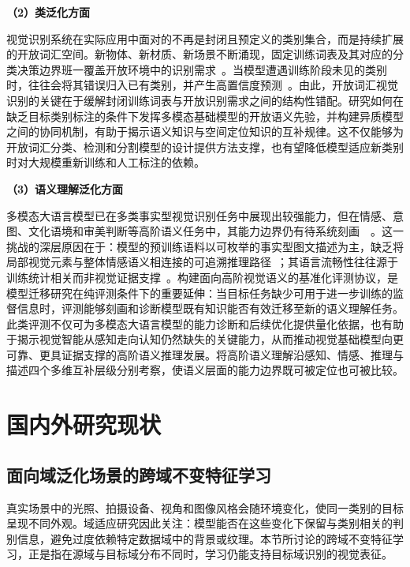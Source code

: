 \noindent\textbf{（2）类泛化方面} 

视觉识别系统在实际应用中面对的不再是封闭且预定义的类别集合，而是持续扩展的开放词汇空间。新物体、新材质、新场景不断涌现，固定训练词表及其对应的分类决策边界班一覆盖开放环境中的识别需求~\cite{kirillov2023segment,radford2021learning}。当模型遭遇训练阶段未见的类别时，往往会将其错误归入已有类别，并产生高置信度预测~\cite{kundu2022towards}。由此，开放词汇视觉识别的关键在于缓解封闭训练词表与开放识别需求之间的结构性错配。研究如何在缺乏目标类别标注的条件下发挥多模态基础模型的开放语义先验，并构建异质模型之间的协同机制，有助于揭示语义知识与空间定位知识的互补规律。这不仅能够为开放词汇分类、检测和分割模型的设计提供方法支撑，也有望降低模型适应新类别时对大规模重新训练和人工标注的依赖。

\newpage
\noindent\textbf{（3）语义理解泛化方面} 

多模态大语言模型已在多类事实型视觉识别任务中展现出较强能力，但在情感、意图、文化语境和审美判断等高阶语义任务中，其能力边界仍有待系统刻画~~\cite{mmbench2023,achlioptas2021artemis,eemobench2025}。这一挑战的深层原因在于：模型的预训练语料以可枚举的事实型图文描述为主，缺乏将局部视觉元素与整体情感语义相连接的可追溯推理路径~\cite{zhao2014exploring,aesexpert2024}；其语言流畅性往往源于训练统计相关而非视觉证据支撑~\cite{eemobench2025}。构建面向高阶视觉语义的基准化评测协议，是模型迁移研究在纯评测条件下的重要延伸：当目标任务缺少可用于进一步训练的监督信息时，评测能够刻画和诊断模型既有知识能否有效迁移至新的语义理解任务。此类评测不仅可为多模态大语言模型的能力诊断和后续优化提供量化依据，也有助于揭示视觉智能从感知走向认知仍然缺失的关键能力，从而推动视觉基础模型向更可靠、更具证据支撑的高阶语义推理发展。将高阶语义理解沿感知、情感、推理与描述四个多维互补层级分别考察，使语义层面的能力边界既可被定位也可被比较。

\section{国内外研究现状}

\subsection{面向域泛化场景的跨域不变特征学习}

真实场景中的光照、拍摄设备、视角和图像风格会随环境变化，使同一类别的目标呈现不同外观。域适应研究因此关注：模型能否在这些变化下保留与类别相关的判别信息，避免过度依赖特定数据域中的背景或纹理。本节所讨论的跨域不变特征学习，正是指在源域与目标域分布不同时，学习仍能支持目标域识别的视觉表征。

